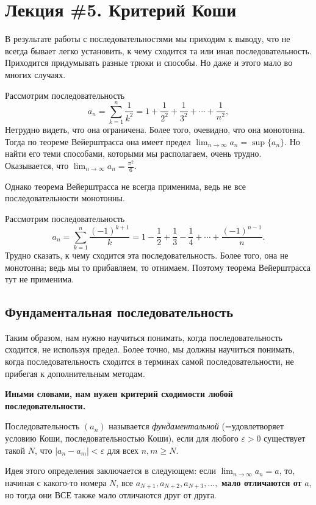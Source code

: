 \section{Лекция \#5. Критерий Коши}

В результате работы с последовательностями мы приходим к выводу, что не всегда бывает легко установить, к чему сходится та или иная последовательность. Приходится придумывать разные трюки и способы. Но даже и этого мало во многих случаях. 

\begin{example}
    Рассмотрим последовательность
    \[
    a_n = \sum_{k=1}^n \frac{1}{k^2} = 1 + \frac{1}{2^2} + \frac{1}{3^2} + \cdots + \frac{1}{n^2},
    \]
    Нетрудно видеть, что она ограничена. Более того, очевидно, что она монотонна. Тогда по теореме Вейерштрасса она имеет предел $\lim_{n \to \infty}a_n = \sup\{a_n\}$. Но найти его теми способами, которыми мы располагаем, очень трудно. Оказывается, что $\lim_{n \to \infty}a_n = \frac{\pi^2}{6}.$
\end{example}

Однако теорема Вейерштрасса не всегда применима, ведь не все последовательности монотонны. 

\begin{example}
    Рассмотрим последовательность
    \[
    a_n = \sum_{k=1}^n \frac{(-1)^{k+1}}{k} = 1 -\frac{1}{2} + \frac{1}{3} - \frac{1}{4} + \cdots + \frac{(-1)^{n-1}}{n}.
    \]
    Трудно сказать, к чему сходится эта последовательность. Более того, она не монотонна; ведь мы то прибавляем, то отнимаем. Поэтому теорема Вейерштрасса тут не применима.
\end{example}

\subsection{Фундаментальная последовательность}

Таким образом, нам нужно научиться понимать, когда последовательность сходится, не используя предел. Более точно, мы должны научиться понимать, когда последовательность сходится в терминах самой последовательности, не прибегая к дополнительным методам. 

\textbf{Иными словами, нам нужен критерий сходимости любой последовательности.}

\begin{definition}\label{foundamental_sequence}
    Последовательность $(a_n)$ называется \textit{фундаментальной} (=удовлетворяет условию Коши, последовательностью Коши), если для любого $\varepsilon >0$ существует такой $N$, что $|a_n -a_m| < \varepsilon$ для всех $n,m \ge N$.
\end{definition}
\begin{comments}
    Идея этого определения заключается в следующем: если $\lim_{n\to \infty}a_n =a$, то, начиная с какого-то номера $N$, все $a_{N+1}, a_{N+2}, a_{N+3}, \ldots,$ \textbf{мало отличаются от} $a$, но тогда они ВСЕ также мало отличаются друг от друга.
\end{comments}

